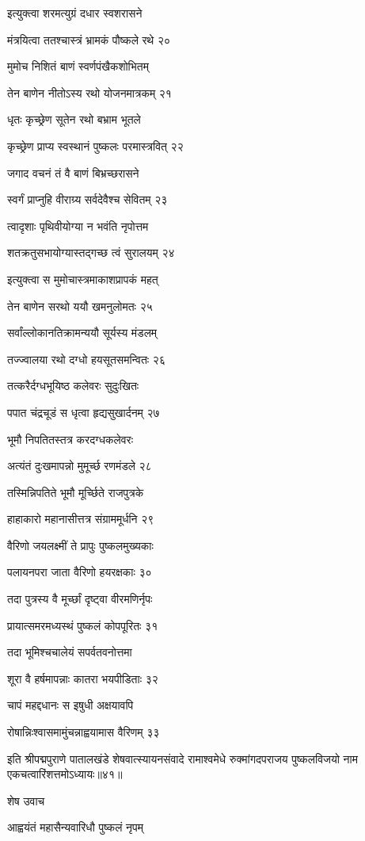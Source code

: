 इत्युक्त्वा शरमत्युग्रं दधार स्वशरासने

मंत्रयित्वा ततश्चास्त्रं भ्रामकं पौष्कले रथे २०

मुमोच निशितं बाणं स्वर्णपंखैकशोभितम्

तेन बाणेन नीतोऽस्य रथो योजनमात्रकम् २१

धृतः कृच्छ्रेण सूतेन रथो बभ्राम भूतले

कृच्छ्रेण प्राप्य स्वस्थानं पुष्कलः परमास्त्रवित् २२

जगाद वचनं तं वै बाणं बिभ्रच्छरासने

स्वर्गं प्राप्नुहि वीराग्र्य सर्वदेवैश्च सेवितम् २३

त्वादृशाः पृथिवीयोग्या न भवंति नृपोत्तम

शतक्रतुसभायोग्यास्तद्गच्छ त्वं सुरालयम् २४

इत्युक्त्वा स मुमोचास्त्रमाकाशप्रापकं महत्

तेन बाणेन सरथो ययौ खमनुलोमतः २५

सर्वांल्लोकानतिक्रामन्ययौ सूर्यस्य मंडलम्

तज्ज्वालया रथो दग्धो हयसूतसमन्वितः २६

तत्करैर्दग्धभूयिष्ठ कलेवरः सुदुःखितः

पपात चंद्रचूडं स धृत्वा हृद्यसुखार्दनम् २७

भूमौ निपतितस्तत्र करदग्धकलेवरः

अत्यंतं दुःखमापन्नो मुमूर्च्छ रणमंडले २८

तस्मिन्निपतिते भूमौ मूर्च्छिते राजपुत्रके

हाहाकारो महानासीत्तत्र संग्राममूर्धनि २९

वैरिणो जयलक्ष्मीं ते प्रापुः पुष्कलमुख्यकाः

पलायनपरा जाता वैरिणो हयरक्षकाः ३०

तदा पुत्रस्य वै मूर्च्छां दृष्ट्वा वीरमणिर्नृपः

प्रायात्समरमध्यस्थं पुष्कलं कोपपूरितः ३१

तदा भूमिश्चचालेयं सपर्वतवनोत्तमा

शूरा वै हर्षमापन्नाः कातरा भयपीडिताः ३२

चापं महद्दधानः स इषुधी अक्षयावपि

रोषान्निःश्वासमामुंचन्नाह्वयामास वैरिणम् ३३

इति श्रीपद्मपुराणे पातालखंडे शेषवात्स्यायनसंवादे रामाश्वमेधे रुक्मांगदपराजय पुष्कलविजयो नाम एकचत्वारिंशत्तमोऽध्यायः॥४१॥


शेष उवाच

आह्वयंतं महासैन्यवारिधौ पुष्कलं नृपम्

